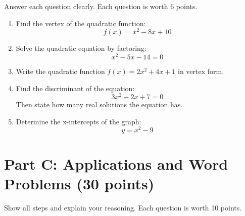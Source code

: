 \documentclass[12pt]{article}
\begin{document}
Answer each question clearly. Each question is worth 6 points.

\begin{enumerate}[label=\arabic*.]
    \item Find the vertex of the quadratic function:
    \[
    f(x) = x^2 - 8x + 10
    \]

    \vspace{2.5cm}

    \item Solve the quadratic equation by factoring:
    \[
    x^2 - 5x - 14 = 0
    \]

    \vspace{2.5cm}

    \item Write the quadratic function $f(x) = 2x^2 + 4x + 1$ in vertex form.

    \vspace{2.5cm}

    \item Find the discriminant of the equation:
    \[
    3x^2 - 2x + 7 = 0
    \]
    Then state how many real solutions the equation has.

    \vspace{2.5cm}

    \item Determine the x-intercepts of the graph:
    \[
    y = x^2 - 9
    \]

    \vspace{2.5cm}
\end{enumerate}

\newpage

\section*{Part C: Applications and Word Problems (30 points)}

Show all steps and explain your reasoning. Each question is worth 10 points.
\end{document}
